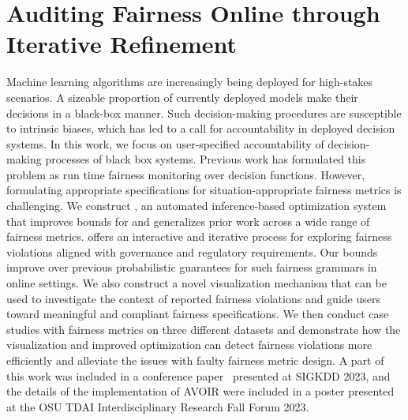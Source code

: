 \chapter{Auditing Fairness Online through Iterative Refinement}
\label{chp:avoir}

Machine learning algorithms are increasingly being deployed for high-stakes scenarios. 
A sizeable proportion of currently deployed models make their decisions in a black-box manner. 
Such decision-making procedures are susceptible to intrinsic biases, which has led to a call for accountability in deployed decision systems.
In this work, we focus on user-specified accountability of decision-making processes of black box systems.
Previous work has formulated this problem as run time fairness monitoring over decision functions.
However, formulating appropriate specifications for situation-appropriate fairness metrics is challenging.
We construct \AVOIRmethodname{}, an automated inference-based optimization system that improves bounds for and generalizes prior work across a wide range of fairness metrics.
\AVOIRmethodname{} offers an interactive and iterative process for exploring fairness violations aligned with governance and regulatory requirements.
Our bounds improve over previous probabilistic guarantees for such fairness grammars in online settings.
We also construct a novel visualization mechanism that can be used to investigate the context of reported fairness violations and guide users toward meaningful and compliant fairness specifications. 
We then conduct case studies with fairness metrics on three different datasets and demonstrate how the visualization and improved optimization can detect fairness violations more efficiently and alleviate the issues with faulty fairness metric design. 
A part of this work was included in a conference paper~\citep{maneriker2023online} presented at SIGKDD 2023, and the details of the implementation of AVOIR were included in a poster presented at the OSU TDAI Interdisciplinary Research Fall Forum 2023.








%
%
%
%
%
%
%
%


\endinput